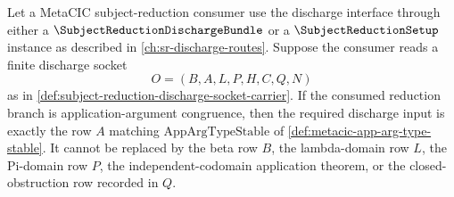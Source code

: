 \begin{proposition}
\label{prop:metacic-appargtypestable-discharge-row-required}
Let a MetaCIC subject-reduction consumer use the discharge interface through either a $\SubjectReductionDischargeBundle$ or a $\SubjectReductionSetup$ instance as described in \autoref{ch:sr-discharge-routes}. Suppose the consumer reads a finite discharge socket
$$
O=(B,A,L,P,H,C,Q,N)
$$
as in \autoref{def:subject-reduction-discharge-socket-carrier}. If the consumed reduction branch is application-argument congruence, then the required discharge input is exactly the row $A$ matching $\mathrm{AppArgTypeStable}$ of \autoref{def:metacic-app-arg-type-stable}. It cannot be replaced by the beta row $B$, the lambda-domain row $L$, the Pi-domain row $P$, the independent-codomain application theorem, or the closed-obstruction row recorded in $Q$.
\end{proposition}
